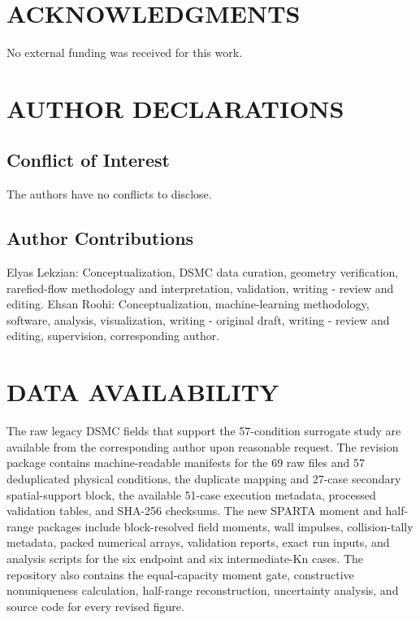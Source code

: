 \documentclass[aip,pof,preprint,floatfix,amsmath,amssymb]{revtex4-2}
\newcommand{\Kn}{\mathrm{Kn}}
\begin{document}
\section*{ACKNOWLEDGMENTS}
No external funding was received for this work.

\section*{AUTHOR DECLARATIONS}
\subsection*{Conflict of Interest}
The authors have no conflicts to disclose.

\subsection*{Author Contributions}
Elyas Lekzian: Conceptualization, DSMC data curation, geometry verification, rarefied-flow methodology and interpretation, validation, writing - review and editing. Ehsan Roohi: Conceptualization, machine-learning methodology, software, analysis, visualization, writing - original draft, writing - review and editing, supervision, corresponding author.

\section*{DATA AVAILABILITY}
The raw legacy DSMC fields that support the 57-condition surrogate study are available from the corresponding author upon reasonable request. The revision package contains machine-readable manifests for the 69 raw files and 57 deduplicated physical conditions, the duplicate mapping and 27-case secondary spatial-support block, the available 51-case execution metadata, processed validation tables, and SHA-256 checksums. The new SPARTA moment and half-range packages include block-resolved field moments, wall impulses, collision-tally metadata, packed numerical arrays, validation reports, exact run inputs, and analysis scripts for the six endpoint and six intermediate-$\Kn$ cases. The repository also contains the equal-capacity moment gate, constructive nonuniqueness calculation, half-range reconstruction, uncertainty analysis, and source code for every revised figure.
\end{document}
